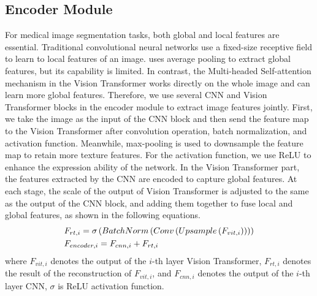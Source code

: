 \documentclass{article}
\begin{document}
\vspace{-4mm}
\subsection{Encoder Module}
\vspace{-1mm}
For medical image segmentation tasks, both global and local features are essential. Traditional convolutional neural networks use a fixed-size receptive field to learn to local features of an image. \cite{huang2021gloria} uses average pooling to extract global features, but its capability is limited. In contrast, the Multi-headed Self-attention mechanism in the Vision Transformer works directly on the whole image and can learn more global features. Therefore, we use several CNN and Vision Transformer blocks in the encoder module to extract image features jointly. First, we take the image as the input of the CNN block and then send the feature map to the Vision Transformer after convolution operation, batch normalization, and activation function. Meanwhile, max-pooling is used to downsample the feature map to retain more texture features.
For the activation function, we use ReLU to enhance the expression ability of the network. In the Vision Transformer part,  the features extracted by the CNN are encoded to capture global features. At each stage, the scale of the output of Vision Transformer is adjusted to the same as the output of the CNN block, and adding them together to fuse local and global features, as shown in the following equations.
\vspace{-2mm}
\begin{eqnarray}
\setlength{\abovedisplayskip}{0pt}
\setlength{\belowdisplayskip}{0pt}
& F_{rt,i}= \sigma\left ( BatchNorm\left ( Conv\left ( Upsample\left ( F_{vit,i}\right )\right ) \right)\right )\label{3.2-1}\\
& F_{encoder,i}= F_{cnn,i}+F_{rt,i}\label{3.2-2}
\setlength{\belowdisplayskip}{3pt}
\end{eqnarray}
where $F_{vit,i}$ denotes the output of the $i$-th layer Vision Transformer, $F_{rt,i}$ denotes the result of the reconstruction of $F_{vit,i}$, and $F_{cnn,i}$ denotes the output of the $i$-th layer CNN, $\sigma$ is ReLU activation function.
 
\end{document}
